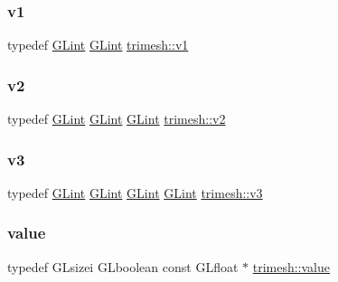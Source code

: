 \subsubsection{\texorpdfstring{v1}{v1}}
{\footnotesize\ttfamily typedef \hyperlink{namespacetrimesh_aeccc290e30b317c861fb146956528187}{G\+Lint} \hyperlink{namespacetrimesh_aeccc290e30b317c861fb146956528187}{G\+Lint} \hyperlink{namespacetrimesh_a02cc42cb0e29e66e5488b53767461f68}{trimesh\+::v1}}

\mbox{\label{namespacetrimesh_ad2ea56e3e595d59c8a18c524465c1906}} 
\subsubsection{\texorpdfstring{v2}{v2}}
{\footnotesize\ttfamily typedef \hyperlink{namespacetrimesh_aeccc290e30b317c861fb146956528187}{G\+Lint} \hyperlink{namespacetrimesh_aeccc290e30b317c861fb146956528187}{G\+Lint} \hyperlink{namespacetrimesh_aeccc290e30b317c861fb146956528187}{G\+Lint} \hyperlink{namespacetrimesh_ad2ea56e3e595d59c8a18c524465c1906}{trimesh\+::v2}}

\mbox{\label{namespacetrimesh_af1de508e9256fa7722bbb44bb7788a89}} 
\subsubsection{\texorpdfstring{v3}{v3}}
{\footnotesize\ttfamily typedef \hyperlink{namespacetrimesh_aeccc290e30b317c861fb146956528187}{G\+Lint} \hyperlink{namespacetrimesh_aeccc290e30b317c861fb146956528187}{G\+Lint} \hyperlink{namespacetrimesh_aeccc290e30b317c861fb146956528187}{G\+Lint} \hyperlink{namespacetrimesh_aeccc290e30b317c861fb146956528187}{G\+Lint} \hyperlink{namespacetrimesh_af1de508e9256fa7722bbb44bb7788a89}{trimesh\+::v3}}

\mbox{\label{namespacetrimesh_ab10cc1052c9d1d1376d92211b6ca27dd}} 
\subsubsection{\texorpdfstring{value}{value}}
{\footnotesize\ttfamily typedef G\+Lsizei G\+Lboolean const G\+Lfloat $\ast$ \hyperlink{namespacetrimesh_ab10cc1052c9d1d1376d92211b6ca27dd}{trimesh\+::value}}

